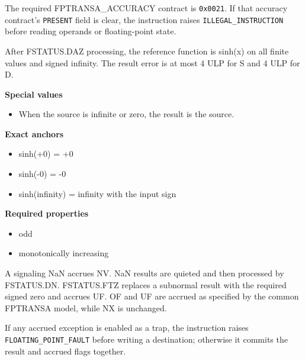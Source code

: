 The required FPTRANSA\_ACCURACY contract is \texttt{0x0021}. If that accuracy contract's \texttt{PRESENT} field is clear, the instruction raises \texttt{ILLEGAL\_INSTRUCTION} before reading operands or floating-point state.

After FSTATUS.DAZ processing, the reference function is sinh(x) on all finite values and signed infinity. The result error is at most 4 ULP for S and 4 ULP for D.

\textbf{Special values}\par
\begin{itemize}
\item When the source is infinite or zero, the result is the source.
\end{itemize}

\textbf{Exact anchors}\par
\begin{itemize}
\item sinh(+0) = +0
\item sinh(-0) = -0
\item sinh(infinity) = infinity with the input sign
\end{itemize}

\textbf{Required properties}\par
\begin{itemize}
\item odd
\item monotonically increasing
\end{itemize}

A signaling NaN accrues NV. NaN results are quieted and then processed by FSTATUS.DN. FSTATUS.FTZ replaces a subnormal result with the required signed zero and accrues UF. OF and UF are accrued as specified by the common FPTRANSA model, while NX is unchanged.

If any accrued exception is enabled as a trap, the instruction raises \texttt{FLOATING\_POINT\_FAULT} before writing a destination; otherwise it commits the result and accrued flags together.
